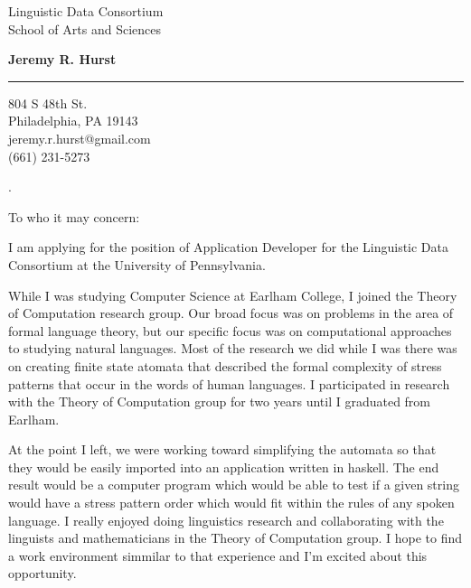 \documentclass{letter} %
\begin{document}
\signature{Jeremy R. Hurst}           %
\longindentation=0pt                       %
\let\raggedleft\raggedright                %
 
 
\begin{letter}{Linguistic Data Consortium \\
School of Arts and Sciences }



\begin{center}
{\large\bf Jeremy R. Hurst} 
\end{center}
\medskip\hrule height 1pt
\begin{center}
{804 S 48th St. \\ Philadelphia, PA 19143 \\ jeremy.r.hurst@gmail.com \\(661) 231-5273} 
\end{center} \vfill %
\vspace*{-100mm}%
\noindent .
\vspace*{50mm}
\opening{To who it may concern:} 
 
\noindent I am applying for the position of Application Developer for the Linguistic Data Consortium at the University of Pennsylvania.

\noindent While I was studying Computer Science at Earlham College, I joined the Theory of Computation research group.
 Our broad focus was on problems in the area of formal language theory, but our specific focus was on computational approaches to studying natural languages.
 Most of the research we did while I was there was on creating finite state atomata that described the formal complexity of stress patterns that occur in the words of human languages.
 I participated in research with the Theory of Computation group for two years until I graduated from Earlham.

\noindent At the point I left, we were working toward simplifying the automata so that they would be easily imported into an application written in haskell.
 The end result would be a computer program which would be able to test if a given string would have a stress pattern order which would fit within the rules of any spoken language.
 I really enjoyed doing linguistics research and collaborating with the linguists and mathematicians in the Theory of Computation group.
 I hope to find a work environment simmilar to that experience and I'm excited about this opportunity. 


\end{letter}
\end{document}
